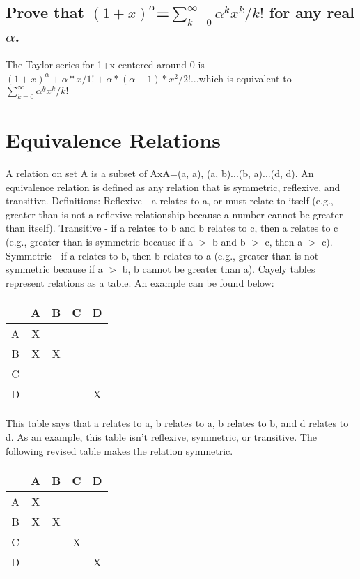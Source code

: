 
\subsection{Prove that $(1+x)^\alpha$=$\sum_{k=0}^{\infty} {\alpha^{\underline{k}}x^k/k!}$ for any real $ \alpha$.}
The Taylor series for 1+x centered around 0 is $(1+x)^\alpha+\alpha*x/1!+\alpha*(\alpha-1)*x^2/2!$...which is equivalent to $\sum_{k=0}^{\infty}{\alpha^{\underline{k}}x^k/k!}$
\section{Equivalence Relations}
A relation on set A is a subset of AxA={(a, a), (a, b)...(b, a)...(d, d)}. An equivalence relation is defined as any relation that is symmetric, reflexive, and transitive. 
\newline
Definitions:
\newline
Reflexive - a relates to a, or must relate to itself (e.g., greater than is not a reflexive relationship because a number cannot be greater than itself).
\newline
Transitive - if a relates to b and b relates to c, then a relates to c (e.g., greater than is symmetric because if a \(>\) b and b \(>\) c, then a \(>\) c).
\newline
Symmetric - if a relates to b, then b relates to a (e.g., greater than is not symmetric because if a \(>\) b, b cannot be greater than a).
\newline
Cayely tables represent relations as a table. An example can be found below:
\begin{center}
\begin{tabular} {c|c c c c}
& A & B & C & D \\
\hline
A & X &  &  &  \\
B & X & X &  &  \\
C &  &  &  &  \\
D &  &  &  & X \\
\end{tabular}
\end{center}
This table says that a relates to a, b relates to a, b relates to b, and d relates to d. As an example, this table isn't reflexive, symmetric, or transitive.
The following revised table makes the relation symmetric.
\begin{center}
\begin{tabular} {c|c c c c}
& A & B & C & D \\
\hline
A & X &  &  &  \\
B & X & X &  &  \\
C &  &  & X &  \\
D &  &  &  & X \\
\end{tabular}
\end{center}
